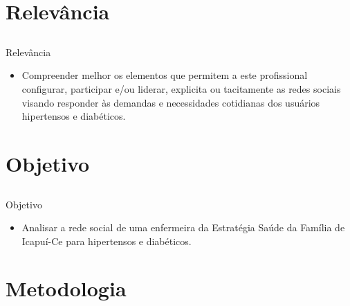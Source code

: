 \documentclass[10pt]{beamer}
\begin{document}
\section{Relevância}
\subsection{}
\begin{frame}{Relevância}{}

\begin{block}{}
  \begin{itemize}
    \item Compreender melhor os elementos que permitem a este profissional configurar, participar e/ou liderar, explicita ou tacitamente as redes sociais visando responder às demandas e necessidades cotidianas dos usuários hipertensos e diabéticos.
  \end{itemize}
\end{block}
\end{frame}

\section{Objetivo}
\subsection{}
\begin{frame}{Objetivo}{}

\begin{block}{}
  \begin{itemize}
    \item Analisar a rede social de uma enfermeira da Estratégia Saúde da Família de Icapuí-Ce para hipertensos e diabéticos.
  \end{itemize}
\end{block}
\end{frame}
     

\section{Metodologia}
\end{document}
